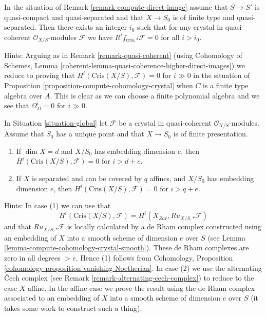 \begin{remark}[Boundedness]
\label{remark-bounded-cohomology}
In the situation of Remark \ref{remark-compute-direct-image}
assume that $S \to S'$ is quasi-compact and quasi-separated and
that $X \to S_0$ is of finite type and quasi-separated. Then there exists
an integer $i_0$ such that for any crystal
in quasi-coherent $\mathcal{O}_{X/S}$-modules $\mathcal{F}$
we have $R^if_{\text{cris}, *}\mathcal{F} = 0$ for all $i > i_0$.

\medskip\noindent
Hints: Arguing as in Remark \ref{remark-quasi-coherent} (using
Cohomology of Schemes, Lemma
\ref{coherent-lemma-quasi-coherence-higher-direct-images})
we reduce to proving that $H^i(\text{Cris}(X/S), \mathcal{F}) = 0$ for $i \gg 0$
in the situation of Proposition \ref{proposition-compute-cohomology-crystal}
when $C$ is a finite type algebra over $A$. This is clear as we can
choose a finite polynomial algebra and we see that $\Omega^i_D = 0$
for $i \gg 0$.
\end{remark}

\begin{remark}
\label{remark-bounded-cohomology-over-point}
In Situation \ref{situation-global} let $\mathcal{F}$ be a crystal in
quasi-coherent $\mathcal{O}_{X/S}$-modules. Assume that $S_0$
has a unique point and that $X \to S_0$ is of finite presentation.
\begin{enumerate}
\item If $\dim X = d$ and $X/S_0$ has embedding dimension $e$, then
$H^i(\text{Cris}(X/S), \mathcal{F}) = 0$ for $i > d + e$.
\item If $X$ is separated and can be covered by $q$ affines, and
$X/S_0$ has embedding dimension $e$, then
$H^i(\text{Cris}(X/S), \mathcal{F}) = 0$ for $i > q + e$.
\end{enumerate}
Hints: In case (1) we can use that
$$
H^i(\text{Cris}(X/S), \mathcal{F}) = H^i(X_{Zar}, Ru_{X/S, *}\mathcal{F})
$$
and that $Ru_{X/S, *}\mathcal{F}$ is locally calculated by a de Rham
complex constructed using an embedding of $X$ into a smooth scheme
of dimension $e$ over $S$
(see Lemma \ref{lemma-compute-cohomology-crystal-smooth}).
These de Rham complexes are zero in all degrees $> e$. Hence (1)
follows from Cohomology, Proposition
\ref{cohomology-proposition-vanishing-Noetherian}.
In case (2) we use the alternating {\v C}ech complex (see
Remark \ref{remark-alternating-cech-complex}) to reduce to the case
$X$ affine. In the affine case we prove the result using the de Rham complex
associated to an embedding of $X$ into a smooth scheme of dimension $e$
over $S$ (it takes some work to construct such a thing).
\end{remark}

